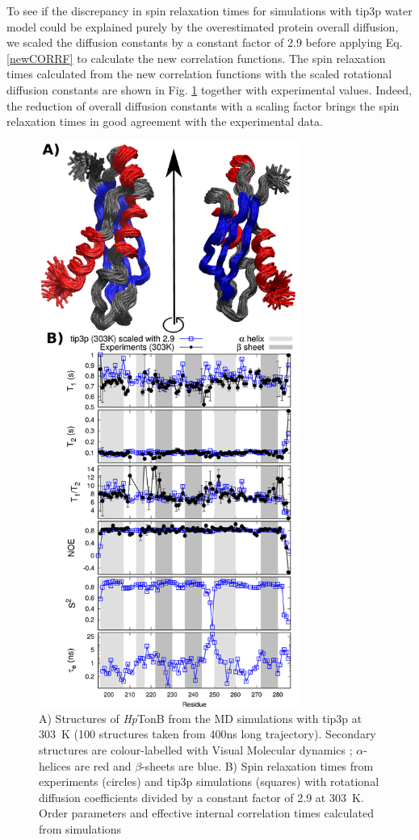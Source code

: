 \documentclass[pre,aps,floatfix,authordate1-4,twocolumn]{revtex4-1}
\begin{document}
To see if the discrepancy in spin relaxation times for simulations with tip3p water model
could be explained purely by the overestimated protein overall diffusion,
we scaled the diffusion constants by a constant factor of 2.9 before applying
Eq. \ref{newCORRF} to calculate the new correlation functions. The spin
relaxation times calculated from the new correlation functions with the scaled
rotational diffusion constants are shown in Fig. \ref{HpTonBrelaxationDATAscaled}
together with experimental values. Indeed, the reduction of overall diffusion
constants with a scaling factor brings the spin relaxation times in good agreement with
the experimental data.
\begin{figure}[!h]
  \includegraphics[width=8.5cm]{../Figs/RELdataHpTonB2.eps}%
  \caption{A) Structures of {\it Hp}TonB from the MD simulations with tip3p at 303~K
    (100 structures taken from 400ns long trajectory). Secondary structures
    are colour-labelled with Visual Molecular dynamics \cite{frishman95,humphrey96};
    $\alpha$-helices are red and $\beta$-sheets are blue.
    B) Spin relaxation times from experiments (circles) and tip3p
    simulations (squares) with rotational diffusion coefficients divided by a
    constant factor of 2.9 at 303~K. Order parameters and effective internal correlation
    times calculated from simulations
    \label{HpTonBrelaxationDATAscaled}}%
\end{figure}
\end{document}
